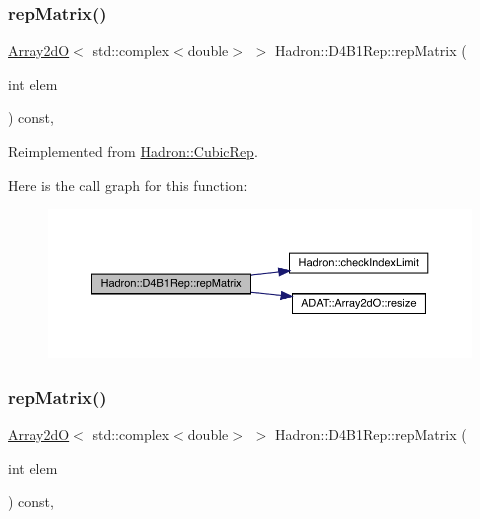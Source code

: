 \subsubsection{\texorpdfstring{repMatrix()}{repMatrix()}\hspace{0.1cm}{\footnotesize\ttfamily [1/3]}}
{\footnotesize\ttfamily \mbox{\hyperlink{classADAT_1_1Array2dO}{Array2dO}}$<$ std\+::complex$<$double$>$ $>$ Hadron\+::\+D4\+B1\+Rep\+::rep\+Matrix (\begin{DoxyParamCaption}\item[{int}]{elem }\end{DoxyParamCaption}) const\hspace{0.3cm}{\ttfamily [inline]}, {\ttfamily [virtual]}}



Reimplemented from \mbox{\hyperlink{structHadron_1_1CubicRep_ac5d7e9e6f4ab1158b5fce3e4ad9e8005}{Hadron\+::\+Cubic\+Rep}}.

Here is the call graph for this function\+:
\nopagebreak
\begin{figure}[H]
\begin{center}
\leavevmode
\includegraphics[width=350pt]{d6/d99/structHadron_1_1D4B1Rep_aaee6044952bae4a4d852115d4e1add07_cgraph}
\end{center}
\end{figure}
\mbox{\label{structHadron_1_1D4B1Rep_aaee6044952bae4a4d852115d4e1add07}} 
\subsubsection{\texorpdfstring{repMatrix()}{repMatrix()}\hspace{0.1cm}{\footnotesize\ttfamily [2/3]}}
{\footnotesize\ttfamily \mbox{\hyperlink{classADAT_1_1Array2dO}{Array2dO}}$<$ std\+::complex$<$double$>$ $>$ Hadron\+::\+D4\+B1\+Rep\+::rep\+Matrix (\begin{DoxyParamCaption}\item[{int}]{elem }\end{DoxyParamCaption}) const\hspace{0.3cm}{\ttfamily [inline]}, {\ttfamily [virtual]}}



